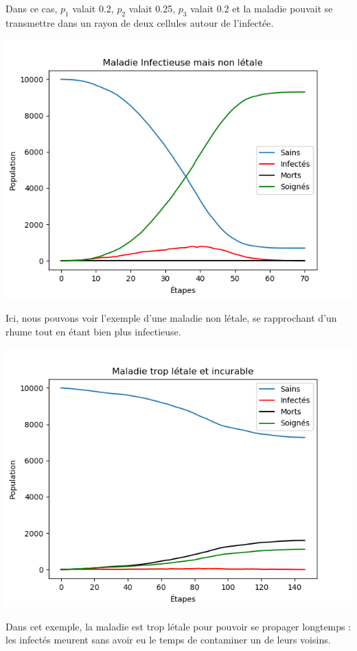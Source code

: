 \documentclass{article}
\begin{document}
	Dans ce cas, $p_1$ valait 0.2, $p_2$ valait 0.25, $p_3$ valait 0.2 et la maladie pouvait se transmettre dans un rayon de deux cellules autour de l'infectée.

\includegraphics[scale=1]{Figure_2.png}


	Ici, nous pouvons voir l'exemple d'une maladie non létale, se rapprochant d'un rhume tout en étant bien plus infectieuse.


\includegraphics[scale=1]{Figure_3.png}



Dans cet exemple, la maladie est trop létale pour pouvoir se propager longtemps : les infectés meurent sans avoir eu le temps de contaminer un de leurs voisins.
\end{document}
